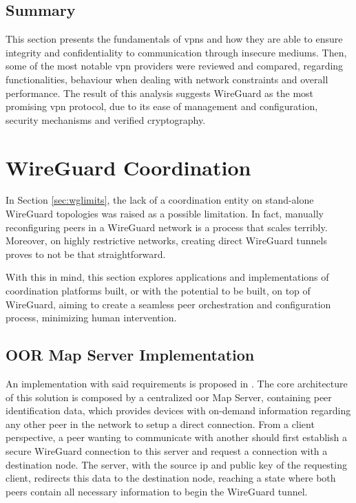 \documentclass[11pt,twoside,a4paper]{report}
\begin{document}
\subsection{Summary}

This section presents the fundamentals of \acp{vpn} and how they are able to ensure integrity and confidentiality to communication through insecure mediums. Then, some of the most notable \ac{vpn} providers were reviewed and compared, regarding functionalities, behaviour when dealing with network constraints and overall performance. The result of this analysis suggests WireGuard as the most promising \ac{vpn} protocol, due to its ease of management and configuration, security mechanisms and verified cryptography.


\section{WireGuard Coordination}
\label{sec:coordination}

In Section \ref{sec:wglimits}, the lack of a coordination entity on stand-alone WireGuard topologies was raised as a possible limitation. In fact, manually reconfiguring peers in a WireGuard network is a process that scales terribly. Moreover, on highly restrictive networks, creating direct WireGuard tunnels proves to not be that straightforward.

With this in mind, this section explores applications and implementations of coordination platforms built, or with the potential to be built, on top of WireGuard, aiming to create a seamless peer orchestration and configuration process, minimizing human intervention.


\iffalse
\subsection{OOR Map Server Implementation}

An implementation with said requirements is proposed in \cite{paillisse2021control}. The core architecture of this solution is composed by a centralized \ac{oor} Map Server, containing peer identification data, which provides devices with on-demand information regarding any other peer in the network to setup a direct connection.  From a client perspective, a peer wanting to communicate with another should first establish a secure WireGuard connection to this server and request a connection with a destination node. The server, with the source \ac{ip} and public key of the requesting client, redirects this data to the destination node, reaching a state where both peers contain all necessary information to begin the WireGuard tunnel.
\end{document}
